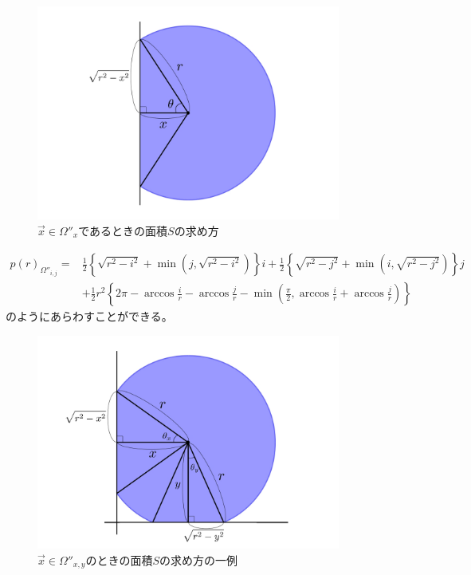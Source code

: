 \begin{figure}[H]
    \begin{center}
        \includegraphics[width=10cm]{../img/omega_x.jpg}
        \caption{$\vec{x} \in \Omega''_{x}$であるときの面積$S$の求め方}
        \label{fig:f21}
    \end{center}
\end{figure}
\begin{align}p(r)_{\Omega''_{i,j}} = &\frac{1}{2}\left\{ \sqrt{r^{2}-i^{2}} + \min \left(j, \sqrt{r^{2}-i^{2}}\right) \right\}i + \frac{1}{2}\left\{ \sqrt{r^{2}-j^{2}} + \min \left( i, \sqrt{r^{2}-j^{2}}\right) \right\}j \nonumber \\
&+ \frac{1}{2}r^{2} \left\{ 2\pi -\arccos \frac{i}{r}-\arccos \frac{j}{r}-\min \left( \frac{\pi}{2}, \arccos \frac{i}{r} +\arccos \frac{j}{r} \right) \right\}
\end{align}
のようにあらわすことができる。
\begin{figure}[H]
    \begin{center}
        \includegraphics[width=10cm]{../img/omega_xy.jpg}
        \caption{$\vec{x} \in \Omega''_{x,y}$のときの面積$S$の求め方の一例}
        \label{fig:f22}
    \end{center}
\end{figure}

